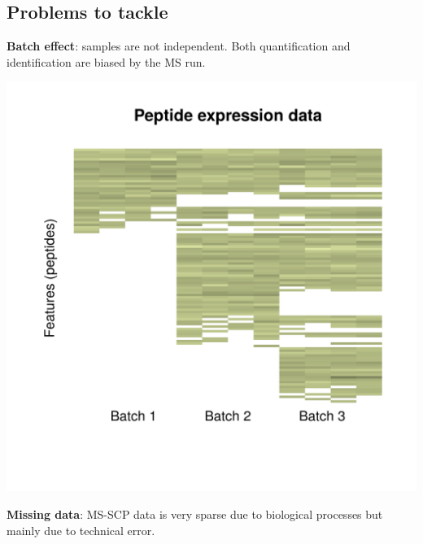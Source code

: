\documentclass{article}
\begin{document}
\begin{multicols}{2}
\begin{minipage}[t]{\linewidth}
  \section*{\huge Problems to tackle}
  \vspace{0.1cm}
\end{minipage}
\begin{minipage}[t]{0.45\linewidth}
  \large
  \textbf{Batch effect}: \normalsize samples are not independent. Both quantification and identification are biased by the MS run.
  \begin{center}
    \includegraphics[width=\linewidth, trim={2cm 9cm 2cm 3.5cm},clip]{figs/batchEffect.png}
  \end{center}
  \vspace{1.5cm}
\end{minipage}
\hspace{1cm}
\begin{minipage}[t]{0.45\linewidth}
  \large
  \textbf{Missing data}: \normalsize MS-SCP data is very sparse due to biological processes but mainly due to technical error.
  \vspace{0.4cm}
  \begin{center}

\end{center}
\end{minipage}
\end{multicols}
\end{document}
